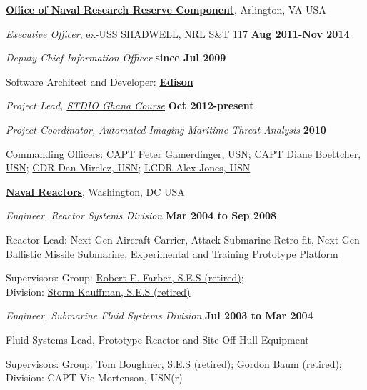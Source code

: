 \documentclass[10pt]{article}
\newenvironment{innerlist}[1][\enskip\textbullet]%
        {\begin{compactitem}[#1]}{\end{compactitem}}
\begin{document}
\href{http://www.onr.navy.mil/en/Science-Technology/Naval-Reservists-p38.aspx}{\textbf{Office of Naval Research Reserve Component}}, Arlington, VA USA
\begin{innerlist}
\item[] \textit{Executive Officer}, ex-USS SHADWELL, NRL S\&T 117%
        \hfill \textbf{Aug 2011-Nov 2014}
\item[] \textit{Deputy Chief Information Officer}%
        \hfill \textbf{since Jul 2009}
\begin{innerlist}
\item Software Architect and Developer: \href{https://edison.nrl.navy.mil/}{\textbf{Edison}}
\end{innerlist}
\item[] \textit{Project Lead, \href{http://stdio-ghana.github.io}{STDIO Ghana Course}}%
        \hfill  \textbf{Oct 2012-present}
\item[] \textit{Project Coordinator, Automated Imaging Maritime Threat Analysis}%
        \hfill  \textbf{2010}
\item[] Commanding Officers: \href{mailto:PETER.M.GAMERDINGER@saic.com}{CAPT Peter Gamerdinger, USN}; \href{mailto:diane.boettcher1@navy.mil}{CAPT Diane Boettcher, USN}; \href{mailto:daniel.m.mirelez@navy.mil}{CDR Dan Mirelez, USN}; \href{mailto:alex.l.jones@navy.mil}{LCDR Alex Jones, USN}
\end{innerlist}

\href{http://nnsa.energy.gov/ourmission/poweringnavy\#hq}{\textbf{Naval Reactors}}, Washington, DC USA
\begin{innerlist}

\item[] \textit{Engineer, Reactor Systems Division}%
        \hfill \textbf{Mar 2004 to Sep 2008}
\begin{innerlist}
\item Reactor Lead: Next-Gen Aircraft Carrier, Attack Submarine Retro-fit, Next-Gen Ballistic Missile Submarine, Experimental and Training Prototype Platform
\item Supervisors: Group: \href{mailto:farberre@comcast.net}{Robert E. Farber, S.E.S (retired)}; \\Division: \href{mailto:skauffman@mpr.com}{Storm Kauffman, S.E.S (retired)}
\end{innerlist}

\item[] \textit{Engineer, Submarine Fluid Systems Division}%
        \hfill \textbf{Jul 2003 to Mar 2004}
\begin{innerlist}
\item Fluid Systems Lead, Prototype Reactor and Site Off-Hull Equipment
\item Supervisors: Group: Tom Boughner, S.E.S (retired); Gordon Baum (retired); \\ Division: CAPT Vic Mortenson, USN(r)
\end{innerlist}
\end{innerlist}
\end{document}
